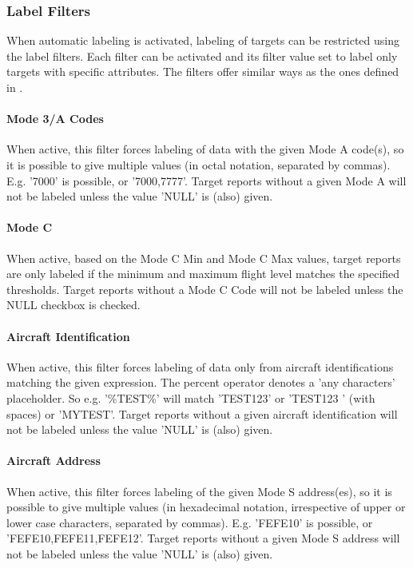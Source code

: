 \subsubsection{Label Filters}

When automatic labeling is activated, labeling of targets can be restricted using the label filters. Each filter can be activated and its filter value set to label only targets with specific attributes. The filters offer similar ways as the ones defined in .

\paragraph{Mode 3/A Codes}

When active, this filter forces labeling of data with the given Mode A code(s), so it is possible to give multiple values (in octal notation, separated by commas). E.g. '7000' is possible, or '7000,7777'. Target reports without a given Mode A will not be labeled unless the value 'NULL' is (also) given. \\

\paragraph{Mode C}

When active, based on the Mode C Min and Mode C Max values, target reports are only labeled if the minimum and maximum flight level matches the specified thresholds. Target reports without a Mode C Code will not be labeled unless the NULL checkbox is checked.

\paragraph{Aircraft Identification}

When active, this filter forces labeling of data only from aircraft identifications matching the given expression. The percent operator denotes a 'any characters' placeholder. So e.g. '\%TEST\%' will match 'TEST123' or 'TEST123   ' (with spaces) or 'MYTEST'. Target reports without a given aircraft identification will not be labeled unless the value 'NULL' is (also) given.


\paragraph{Aircraft Address}

When active, this filter forces labeling of the given Mode S address(es), so it is possible to give multiple values (in hexadecimal notation, irrespective of upper or lower case characters, separated by commas). E.g. 'FEFE10' is possible, or 'FEFE10,FEFE11,FEFE12'. Target reports without a given Mode S address will not be labeled unless the value 'NULL' is (also) given.



